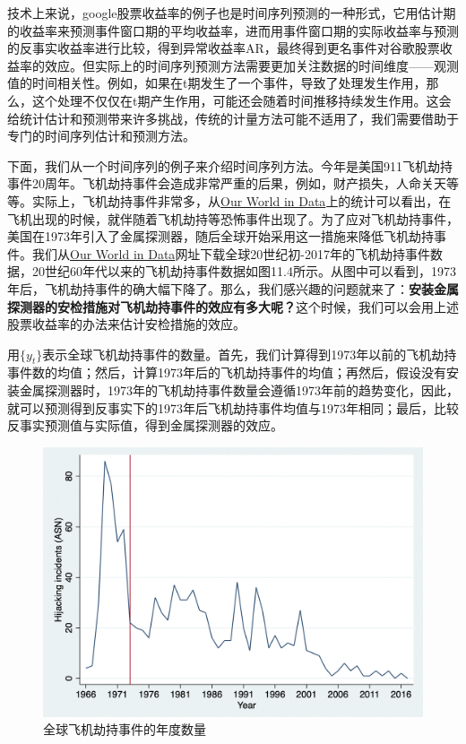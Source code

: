\documentclass[cn,12pt,math=newtx,citestyle=gb7714-2015,bibstyle=gb7714-2015]{elegantbook}
\begin{document}
    技术上来说，google股票收益率的例子也是时间序列预测的一种形式，它用估计期的收益率来预测事件窗口期的平均收益率，进而用事件窗口期的实际收益率与预测的反事实收益率进行比较，得到异常收益率AR，最终得到更名事件对谷歌股票收益率的效应。但实际上的时间序列预测方法需要更加关注数据的时间维度——观测值的时间相关性。例如，如果在t期发生了一个事件，导致了处理发生作用，那么，这个处理不仅仅在t期产生作用，可能还会随着时间推移持续发生作用。这会给统计估计和预测带来许多挑战，传统的计量方法可能不适用了，我们需要借助于专门的时间序列估计和预测方法。
	
	下面，我们从一个时间序列的例子来介绍时间序列方法。今年是美国911飞机劫持事件20周年。飞机劫持事件会造成非常严重的后果，例如，财产损失，人命关天等等。实际上，飞机劫持事件非常多，从\href{https://ourworldindata.org/terrorism}{Our World in Data}上的统计可以看出，在飞机出现的时候，就伴随着飞机劫持等恐怖事件出现了。为了应对飞机劫持事件，美国在1973年引入了金属探测器，随后全球开始采用这一措施来降低飞机劫持事件。我们从\href{https://ourworldindata.org/terrorism}{Our World in Data}网址下载全球20世纪初-2017年的飞机劫持事件数据，20世纪60年代以来的飞机劫持事件数据如图11.4所示。从图中可以看到，1973年后，飞机劫持事件的确大幅下降了。那么，我们感兴趣的问题就来了：\textbf{安装金属探测器的安检措施对飞机劫持事件的效应有多大呢？}这个时候，我们可以会用上述股票收益率的办法来估计安检措施的效应。
	
	用$\{y_t\}$表示全球飞机劫持事件的数量。首先，我们计算得到1973年以前的飞机劫持事件数的均值；然后，计算1973年后的飞机劫持事件的均值；再然后，假设没有安装金属探测器时，1973年的飞机劫持事件数量会遵循1973年前的趋势变化，因此，就可以预测得到反事实下的1973年后飞机劫持事件均值与1973年相同；最后，比较反事实预测值与实际值，得到金属探测器的效应。
	
	\begin{figure}[tbph]
		\centering
		\includegraphics[width=1\linewidth, height=0.5\textheight]{hijacking}
		\caption{全球飞机劫持事件的年度数量}
		\label{fig:hijacking}
	\end{figure}
	
\end{document}

